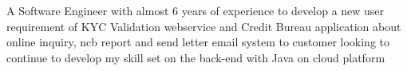 


\begin{cvparagraph}


    A Software Engineer with almost 6 years of experience to develop a new user requirement of KYC Validation webservice and Credit Bureau application about online inquiry, ncb report and send letter email system to customer looking to continue to develop my skill set on the back-end with Java on cloud platform

\end{cvparagraph}
